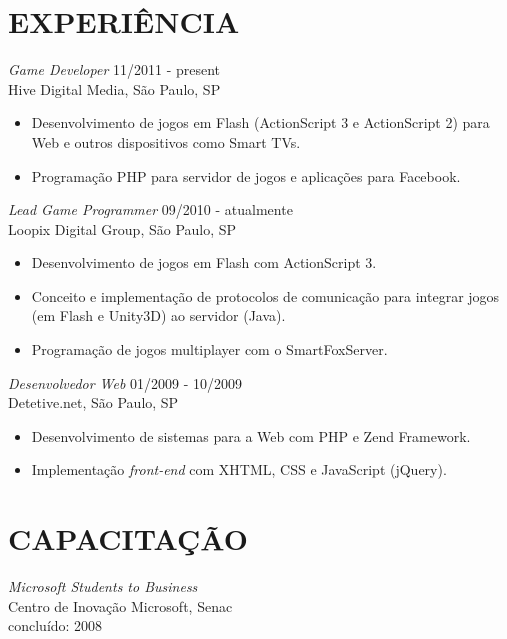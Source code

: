 \documentclass[line,margin]{res}
\begin{document}
\begin{resume}
\section{EXPERIÊNCIA} {\sl Game Developer} \hfill 11/2011 - present \\
                Hive Digital Media, São Paulo, SP
                 \begin{itemize}  \itemsep -2pt %
                 \item Desenvolvimento de jogos em Flash (ActionScript 3 e ActionScript 2) para Web e outros dispositivos como Smart TVs.
                 \item Programação PHP para servidor de jogos e aplicações para Facebook.
                 \end{itemize}
                 
                 {\sl Lead Game Programmer} \hfill 09/2010 - atualmente \\
                Loopix Digital Group, São Paulo, SP
                 \begin{itemize}  \itemsep -2pt %
                 \item Desenvolvimento de jogos em Flash com ActionScript 3.
                 \item Conceito e implementação de protocolos de comunicação para integrar jogos (em Flash e Unity3D) ao servidor (Java).
                 \item Programação de jogos multiplayer com o SmartFoxServer.
                 \end{itemize}
 
                {\sl Desenvolvedor Web} \hfill 01/2009 - 10/2009 \\
                Detetive.net, São Paulo, SP
                 \begin{itemize}  \itemsep -2pt %
                 \item Desenvolvimento de sistemas para a Web com PHP e Zend Framework.
                 \item Implementação {\sl front-end} com XHTML, CSS e JavaScript (jQuery).
                 \end{itemize} 

\section{CAPACITAÇÃO}             
           {\sl Microsoft Students to Business} \\
                Centro de Inovação Microsoft, Senac \\
                concluído: 2008 



\end{resume}
\end{document}
